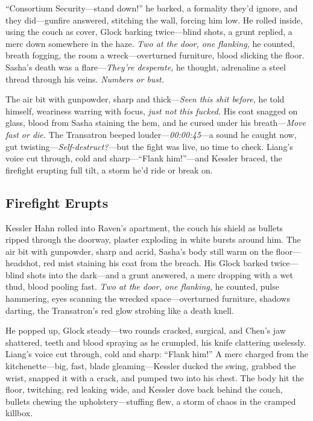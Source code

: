 \documentclass[12pt]{book}
\begin{document}
“Consortium Security—stand down!” he barked, a formality they’d ignore, and they did—gunfire answered, stitching the wall, forcing him low. He rolled inside, using the couch as cover, Glock barking twice—blind shots, a grunt replied, a merc down somewhere in the haze. \textit{Two at the door, one flanking,} he counted, breath fogging, the room a wreck—overturned furniture, blood slicking the floor. Sasha’s death was a flare—\textit{They’re desperate,} he thought, adrenaline a steel thread through his veins. \textit{Numbers or bust.}

The air bit with gunpowder, sharp and thick—\textit{Seen this shit before,} he told himself, weariness warring with focus, \textit{just not this fucked.} His coat snagged on glass, blood from Sasha staining the hem, and he cursed under his breath—\textit{Move fast or die.} The Transatron beeped louder—\textit{00:00:45}—a sound he caught now, gut twisting—\textit{Self-destruct?}—but the fight was live, no time to check. Liang’s voice cut through, cold and sharp—“Flank him!”—and Kessler braced, the firefight erupting full tilt, a storm he’d ride or break on.

\subsection{Firefight Erupts}

Kessler Hahn rolled into Raven’s apartment, the couch his shield as bullets ripped through the doorway, plaster exploding in white bursts around him. The air bit with gunpowder, sharp and acrid, Sasha’s body still warm on the floor—headshot, red mist staining his coat from the breach. His Glock barked twice—blind shots into the dark—and a grunt answered, a merc dropping with a wet thud, blood pooling fast. \textit{Two at the door, one flanking,} he counted, pulse hammering, eyes scanning the wrecked space—overturned furniture, shadows darting, the Transatron’s red glow strobing like a death knell.

He popped up, Glock steady—two rounds cracked, surgical, and Chen’s jaw shattered, teeth and blood spraying as he crumpled, his knife clattering uselessly. Liang’s voice cut through, cold and sharp: “Flank him!” A merc charged from the kitchenette—big, fast, blade gleaming—Kessler ducked the swing, grabbed the wrist, snapped it with a crack, and pumped two into his chest. The body hit the floor, twitching, red leaking wide, and Kessler dove back behind the couch, bullets chewing the upholstery—stuffing flew, a storm of chaos in the cramped killbox.
\end{document}
